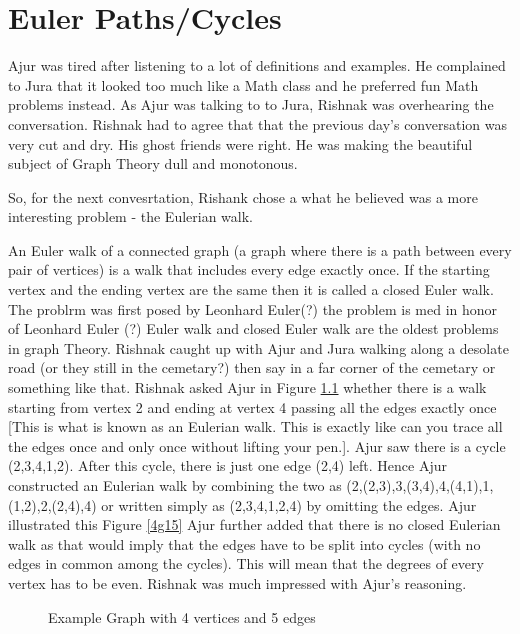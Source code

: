 \chapter{Euler Paths/Cycles}

Ajur was tired after listening to a lot of definitions and examples. He complained to Jura that it looked too much like a Math class and he preferred fun Math problems instead. As Ajur was talking to  to Jura, Rishnak was overhearing the conversation. Rishnak had to agree that that the previous day's conversation was very cut and dry. His ghost friends were right. He was making the beautiful subject of Graph Theory dull and monotonous.

So, for the next convesrtation, Rishank chose a what he believed was a more interesting problem - the Eulerian walk. 

An Euler walk of a connected graph (a graph where there is a path between every pair of vertices) is a walk that includes every edge exactly once. If the starting vertex and the ending vertex are the same then it is called a closed Euler walk. The problrm was first posed by Leonhard Euler(?) the problem is med in honor of Leonhard Euler (?) 
 Euler walk and closed Euler walk are the oldest problems in graph Theory. Rishnak caught up with Ajur and Jura walking along a desolate road (or they still in the cemetary?) then say in a far corner of the cemetary or something like that.  Rishnak asked Ajur in  Figure \ref{4g1} whether there is a walk starting from vertex 2 and ending at vertex 4 passing all the edges exactly once [This is what is known as an Eulerian walk. This is exactly like can you trace all the edges once and only once without lifting your pen.]. Ajur saw there is a cycle (2,3,4,1,2). After this cycle, there is just one edge (2,4) left. Hence Ajur constructed an Eulerian walk by combining the two as (2,(2,3),3,(3,4),4,(4,1),1,(1,2),2,(2,4),4) or written simply as (2,3,4,1,2,4) by omitting the edges. Ajur illustrated this Figure \ref{4g15} Ajur further added that there is no closed Eulerian walk as that would imply that the edges have to be split into cycles (with no edges in common among the cycles). This will mean that the degrees of every vertex has to be even. Rishnak was much impressed with Ajur's reasoning. 


\begin{figure}
\begin{center}
\caption{ Example Graph with 4 vertices and 5 edges}\label{4g1}
\end{center}
\end{figure}

